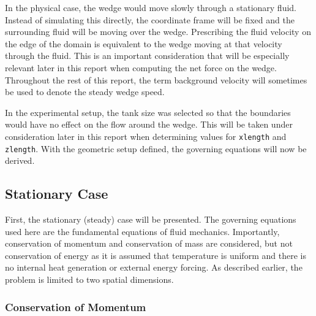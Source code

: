 \documentclass[12pt]{article}
\begin{document}

In the physical case, the wedge would move slowly through a stationary fluid. Instead of simulating this directly, the coordinate frame will be fixed and the surrounding fluid will be moving over the wedge. Prescribing the fluid velocity on the edge of the domain is equivalent to the wedge moving at that velocity through the fluid. This is an important consideration that will be especially relevant later in this report when computing the net force on the wedge. Throughout the rest of this report, the term background velocity will sometimes be used to denote the steady wedge speed.

In the experimental setup, the tank size was selected so that the boundaries would have no effect on the flow around the wedge. This will be taken under consideration later in this report when determining values for \texttt{xlength} and \texttt{zlength}. With the geometric setup defined, the governing equations will now be derived.

\subsection{Stationary Case}

First, the stationary (steady) case will be presented. The governing equations used here are the fundamental equations of fluid mechanics. Importantly, conservation of momentum and conservation of mass are considered, but not conservation of energy as it is assumed that temperature is uniform and there is no internal heat generation or external energy forcing. As described earlier, the problem is limited to two spatial dimensions.

\subsubsection{Conservation of Momentum}
\end{document}
